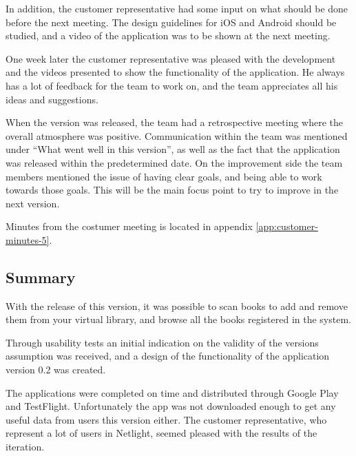 In addition, the customer representative had some input on what should be done before the next meeting. The design guidelines for iOS and Android should be studied, and a video of the application was to be shown at the next meeting.

One week later the customer representative was pleased with the development and the videos presented to show the functionality of the application. He always has a lot of feedback for the team to work on, and the team appreciates all his ideas and suggestions.

When the version was released, the team had a retrospective meeting where the overall atmosphere was positive. Communication within the team was mentioned under “What went well in this version”, as well as the fact that the application was released within the predetermined date. On the improvement side the team members mentioned the issue of having clear goals, and being able to work towards those goals. This will be the main focus point to try to improve in the next version.

Minutes from the costumer meeting is located in appendix \ref{app:customer-minutes-5}.

\subsection{Summary}
With the release of this version, it was possible to scan books to add and remove them from your virtual library, and browse all the books registered in the system.

Through usability tests an initial indication on the validity of the versions assumption was received, and a design of the functionality of the application version 0.2 was created.

The applications were completed on time and distributed through Google Play and TestFlight. Unfortunately the app was not downloaded enough to get any useful data from users this version either. The customer representative, who represent a lot of users in Netlight, seemed pleased with the results of the iteration.
